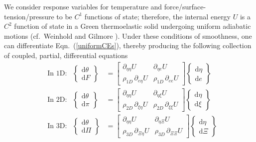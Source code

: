 We consider response variables for temperature and force\slash surface-tension\slash pressure to be $C^1$ functions of state; therefore, the internal energy $U$ is a $C^2$ function of state in a Green thermo\-elastic solid undergoing uniform adiabatic motions (cf.\ Weinhold \cite{Weinhold75c} and Gilmore \cite{Gilmore84}).  Under these conditions of smoothness, one can differentiate Eqn.~(\ref{uniformCEs}), thereby producing the following collection of coupled, partial, differential equations
\begin{subequations}
    \label{GreenElasticODEs}
    \begin{align}
    \mbox{} & \text{In 1D:} &
    \left\{ \begin{matrix} \mathrm{d} \theta \\ 
    \mathrm{d} F \end{matrix} \right\} & = \begin{bmatrix}
    \partial_{\eta\eta} U & \partial_{\eta e} U \\
    \rho_{1D} \, \partial_{e \eta} U & \rho_{1D} \, \partial_{ee} U \end{bmatrix} 
    \left\{ \begin{matrix} \mathrm{d} \eta \\
    \mathrm{d} e \end{matrix} \right\} \\
    \mbox{} & \text{In 2D:} &
    \left\{ \begin{matrix} \mathrm{d} \theta \\ 
    \mathrm{d} \pi \end{matrix} \right\} & = \begin{bmatrix}
    \partial_{\eta\eta} U & \partial_{\eta \xi} U \\
    \rho_{2D} \, \partial_{\xi\eta} U & \rho_{2D} \, \partial_{\xi\xi} U \end{bmatrix} \left\{ \begin{matrix} \mathrm{d} \eta \\
    \mathrm{d} \xi \end{matrix} \right\} \label{GreenMembrane} \\
    \mbox{} & \text{In 3D:} &
    \left\{ \begin{matrix} \mathrm{d} \theta \\ 
    \mathrm{d} \Pi \end{matrix} \right\} & = \begin{bmatrix}
    \partial_{\eta\eta} U & \partial_{\eta\Xi} U \\
    \rho_{3D} \, \partial_{\Xi \eta} U & \rho_{3D} \, \partial_{\Xi\Xi} U \end{bmatrix} \left\{ \begin{matrix} \mathrm{d} \eta \\
    \mathrm{d} \Xi \end{matrix} \right\} \label{GreenSolid}
    \end{align}
\end{subequations}
